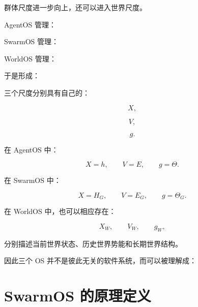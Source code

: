群体尺度进一步向上，还可以进入世界尺度。

AgentOS 管理：

\begin{statementbox}
\centering
{}
\end{statementbox}

SwarmOS 管理：

\begin{statementbox}
\centering
{}
\end{statementbox}

WorldOS 管理：

\begin{statementbox}
\centering
{}
\end{statementbox}

于是形成：

\begin{statementbox}
\centering
{}
\end{statementbox}

三个尺度分别具有自己的：

\[
X,
\]

\[
V,
\]

\[
g.
\]

在 AgentOS 中：

\[
X=h,
\qquad
V=E,
\qquad
g=\Theta.
\]

在 SwarmOS 中：

\[
X=H_G,
\qquad
V=E_G,
\qquad
g=\Theta_G.
\]

在 WorldOS 中，也可以相应存在：

\[
X_W,
\qquad
V_W,
\qquad
g_W,
\]

分别描述当前世界状态、历史世界势能和长期世界结构。

因此三个 OS 并不是彼此无关的软件系统，而可以被理解成：

\begin{statementbox}
\centering
{}
\end{statementbox}


\section{SwarmOS 的原理定义}

